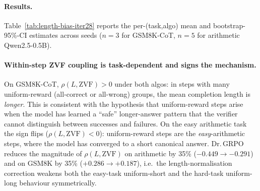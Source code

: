 \paragraph{Results.}
Table~\ref{tab:length-bias-iter28} reports the per-(task,algo) mean and
bootstrap-95\%-CI estimates across seeds ($n{=}3$ for GSM8K-CoT,
$n{=}5$ for arithmetic Qwen2.5-0.5B).

\begin{table}[htbp]
\centering
\small
\caption{Iter 28 step-decomposition of length trajectories on GSM8K-CoT
(Qwen2.5-1.5B, 30 steps, $n{=}3$ seeds) and arithmetic easy
(Qwen2.5-0.5B, 40 steps, $n{=}5$ seeds). $L$-slope is in tokens/step;
$R$-slope is in probability/step. $\rho(L,\mathrm{ZVF})$ and $\rho(L,R)$
are Spearman within-step; 95\% CIs are bootstrap over seeds.
\label{tab:length-bias-iter28}}
\end{table}

\paragraph{Within-step ZVF coupling is task-dependent and signs the
mechanism.}
On GSM8K-CoT, $\rho(L, \mathrm{ZVF}) > 0$ under both algos: in steps with
many uniform-reward (all-correct or all-wrong) groups, the mean
completion length is \emph{longer}. This is consistent with the
hypothesis that uniform-reward steps arise when the model has learned a
``safe'' longer-answer pattern that the verifier cannot distinguish
between successes and failures. On the easy arithmetic task the sign
flips ($\rho(L, \mathrm{ZVF}) < 0$): uniform-reward steps are the
\emph{easy}-arithmetic steps, where the model has converged to a short
canonical answer. Dr.\,GRPO reduces the magnitude of $\rho(L, \mathrm{ZVF})$
on arithmetic by 35\% ($-0.449 \to -0.291$) and on GSM8K by 35\%
($+0.286 \to +0.187$), i.e.\ the length-normalisation correction
weakens both the easy-task uniform-short and the hard-task uniform-long
behaviour symmetrically.

